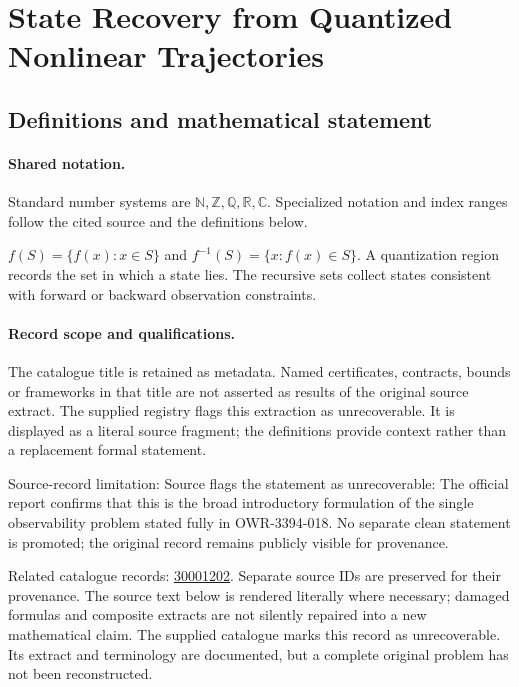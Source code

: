 \documentclass[11pt]{article}
\begin{document}
\section{State Recovery from Quantized Nonlinear Trajectories}\label{statement}

\subsection{Definitions and mathematical statement}

\paragraph{Shared notation.}Standard number systems are $\mathbb N,\mathbb Z,\mathbb Q,\mathbb R,\mathbb C$. Specialized notation and index ranges follow the cited source and the definitions below.


$f(S)=\{f(x):x\in S\}$ and $f^{-1}(S)=\{x:f(x)\in S\}$. A quantization region records the set in which a state lies. The recursive sets collect states consistent with forward or backward observation constraints.
\paragraph{Record scope and qualifications.}
The catalogue title is retained as metadata. Named certificates, contracts, bounds or frameworks in that title are not asserted as results of the original source extract.
The supplied registry flags this extraction as unrecoverable. It is displayed as a literal source fragment; the definitions provide context rather than a replacement formal statement.

Source-record limitation: Source flags the statement as unrecoverable: The official report confirms that this is the broad introductory formulation of the single observability problem stated fully in OWR-3394-018. No separate clean statement is promoted; the original record remains publicly visible for provenance.

Related catalogue records: \href{https://mehmetmars7.github.io/Erdosproblems-llm-hunter/problem.html?type=open_problems&id=30001202}{30001202}. Separate source IDs are preserved for their provenance.
The source text below is rendered literally where necessary; damaged formulas and composite extracts are not silently repaired into a new mathematical claim.
The supplied catalogue marks this record as unrecoverable. Its extract and terminology are documented, but a complete original problem has not been reconstructed.
\end{document}
